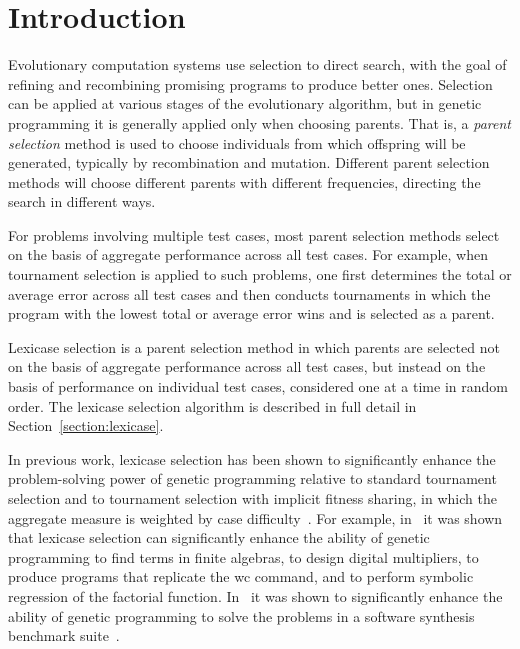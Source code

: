 \documentclass{sig-alternate}
\begin{document}
%
%

%
%
\printccsdesc



\section{Introduction}
\label{section:introduction}

Evolutionary computation systems use selection to direct search, with the goal of refining and recombining promising programs to produce better ones. Selection can be applied at various stages of the evolutionary algorithm, but in genetic programming it is generally applied only when choosing parents. That is, a \emph{parent selection} method is used to choose individuals from which offspring will be generated, typically by recombination and mutation. Different parent selection methods will choose different parents with different frequencies, directing the search in different ways.

For problems involving multiple test cases, most parent selection methods select on the basis of aggregate performance across all test cases. For example, when tournament selection is applied to such problems, one first determines the total or average error across all test cases and then conducts tournaments in which the program with the lowest total or average error wins and is selected as a parent.

Lexicase selection is a parent selection method in which parents are selected not on the basis of aggregate performance across all test cases, but instead on the basis of performance on individual test cases, considered one at a time in random order. The lexicase selection algorithm is described in full detail in Section~\ref{section:lexicase}.

In previous work, lexicase selection has been shown to significantly enhance the problem-solving power of genetic programming relative to standard tournament selection and to tournament selection with implicit fitness sharing, in which the aggregate measure is weighted by case difficulty~\cite{McKay:2000:GECCO}. For example, in~\cite{Helmuth:2014:ieeeTEC} it was shown that lexicase selection can significantly enhance the ability of genetic programming to find terms in finite algebras, to design digital multipliers, to produce programs that replicate the {\ttfamily wc} command, and to perform symbolic regression of the factorial function. In~\cite{Helmuth:2015:dissertation} it was shown to significantly enhance the ability of genetic programming to solve the problems in a software synthesis benchmark suite~\cite{Helmuth:2015:GECCO}.
\end{document}
